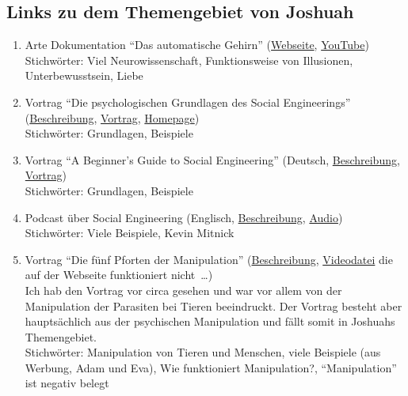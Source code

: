 \subsection*{Links zu dem Themengebiet von Joshuah}
\begin{enumerate}
	\item Arte Dokumentation \enquote{Das automatische Gehirn}
		(\href{http://www.arte.tv/de/4308796.html}{Webseite},
		\href{http://www.youtube.com/watch?v=fP2Czgyu6Dc}{YouTube}) \\
		Stichwörter: Viel Neurowissenschaft, Funktionsweise von Illusionen, Unterbewusstsein, Liebe
	\item Vortrag \enquote{Die psychologischen Grundlagen des Social
		Engineerings} (\href{http://events.ccc.de/camp/2011/Fahrplan/events/4478.en.html}{Beschreibung},
		\href{http://media.ccc.de/browse/conferences/camp2011/cccamp11-4478-die_psychologischen_grundlagen_des_social_engineerings-de.html}
		{Vortrag}, \href{http://www.kaishakunin.com/social-engineering/index.html}{Homepage}) \\
		Stichwörter: Grundlagen, Beispiele
	\item Vortrag \enquote{A Beginner's Guide to Social Engineering}
		(Deutsch, \href{http://www.mitternachtshacking.de/blog/%
			1157-eh2010-a-beginners-guide-to-social-engineering}%
		{Beschreibung},
		\href{http://media.ccc.de/browse/conferences/eh2010/EH2010-3765-de-socialengineering.html}
		{Vortrag})
		\\ Stichwörter: Grundlagen, Beispiele
	\item Podcast über Social Engineering
		(Englisch, \href{http://www.2600.com/offthehook/2011/0511.html}{Beschreibung},
		\href{http://www.2600.com/offthehook/mp3files/2011/off_the_hook__20110504.mp3}{Audio}) \\
		Stichwörter: Viele Beispiele, Kevin Mitnick
	\item Vortrag \enquote{Die fünf Pforten der Manipulation}
		(\href{http://events.ccc.de/congress/2002/fahrplan/event/453.de.html}{Beschreibung},
		\href{ftp://ftp.ccc.de/congress/2002/video/19C3-453-die-fuenf-pforten-der-manipulation.mp4}{Videodatei}
		die auf der Webseite funktioniert nicht~\dots) \\
		Ich hab den Vortrag vor circa  %
		gesehen und war vor allem von der Manipulation der Parasiten bei Tieren beeindruckt.
		Der Vortrag besteht aber hauptsächlich aus der psychischen Manipulation
		und fällt somit in Joshuahs Themengebiet. \\
		Stichwörter: Manipulation von Tieren und Menschen, viele Beispiele (aus Werbung, Adam und Eva),
			Wie funktioniert Manipulation?, \enquote{Manipulation} ist negativ belegt
\end{enumerate}

